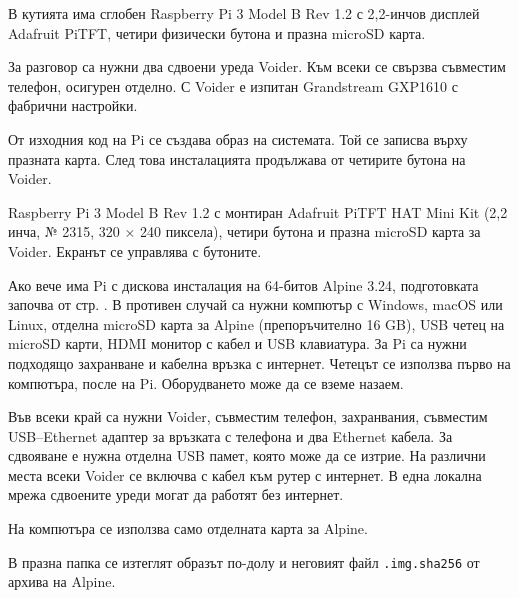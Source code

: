 \emergency

В кутията има сглобен Raspberry Pi 3 Model B Rev 1.2 с 2,2-инчов дисплей Adafruit PiTFT, четири физически бутона и празна microSD карта.

За разговор са нужни два сдвоени уреда Voider. Към всеки се свързва съвместим телефон, осигурен отделно. С Voider е изпитан Grandstream GXP1610 с фабрични настройки.

От изходния код на Pi се създава образ на системата. Той се записва върху празната карта. След това инсталацията продължава от четирите бутона на Voider.

Raspberry Pi 3 Model B Rev 1.2 с монтиран Adafruit PiTFT HAT Mini Kit (2,2 инча, № 2315, 320 × 240 пиксела), четири бутона и празна microSD карта за Voider. Екранът се управлява с бутоните.

Ако вече има Pi с дискова инсталация на 64-битов Alpine 3.24, подготовката започва от стр. \pageref{bg:build}. В противен случай са нужни компютър с Windows, macOS или Linux, отделна microSD карта за Alpine (препоръчително 16 GB), USB четец на microSD карти, HDMI монитор с кабел и USB клавиатура. За Pi са нужни подходящо захранване и кабелна връзка с интернет. Четецът се използва първо на компютъра, после на Pi. Оборудването може да се вземе назаем.

Във всеки край са нужни Voider, съвместим телефон, захранвания, съвместим USB--Ethernet адаптер за връзката с телефона и два Ethernet кабела. За сдвояване е нужна отделна USB памет, която може да се изтрие. На различни места всеки Voider се включва с кабел към рутер с интернет. В една локална мрежа сдвоените уреди могат да работят без интернет.

На компютъра се използва само отделната карта за Alpine.

В празна папка се изтеглят образът по-долу и неговият файл \texttt{.img.sha256} от архива на Alpine.\par
\alpineSource\par
\alpineFile

